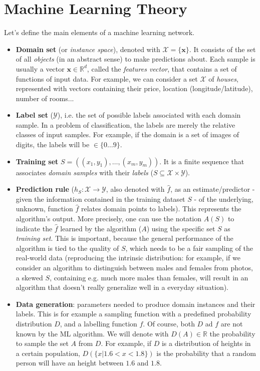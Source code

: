 \documentclass[../template.tex]{subfiles}
\begin{document}
\section{Machine Learning Theory}
Let's define the main elements of a machine learning network.
\begin{itemize}
    \item \textbf{Domain set} (or \textit{instance space}), denoted with $\mathcal{X} = \{\bm{x}\}$. It consists of the set of all \textit{objects} (in an abstract sense) to make predictions about. Each sample is usually a vector $\bm{x} \in \mathbb{R}^d$, called the \textit{features vector}, that contains a set of functions of input data. For example, we can consider a set $\mathcal{X}$ of \textit{houses}, represented with vectors containing their price, location (longitude/latitude), number of rooms...
    \item \textbf{Label set} ($\mathcal{Y}$), i.e. the set of possible labels associated with each domain sample. In a problem of classification, the labels are merely the relative classes of input samples. For example, if the domain is a set of images of digits, the labels will be $\in \{0\dots 9\}$.
    \item \textbf{Training set} $S = ((x_1, y_1), \dots, (x_m, y_m))$. It is a finite sequence that associates \textit{domain samples} with their \textit{labels} ($S \subseteq \mathcal{X} \times \mathcal{Y}$).
    \item \textbf{Prediction rule} ($h_S\colon \mathcal{X} \to \mathcal{Y}$, also denoted with $\hat{f}$, as an estimate/predictor - given the information contained in the training dataset $S$ - of the underlying, unknown, function $\hat{f}$ relates domain points to labels).  This represents the algorithm's output. More precisely, one can use the notation $A(S)$ to indicate the $\hat{f}$ learned by the algorithm ($A$) using the specific set $S$ as \textit{training set}. This is important, because the general performance of the algorithm is tied to the quality of $S$, which needs to be a fair sampling of the real-world data (reproducing the intrinsic distribution: for example, if we consider an algorithm to distinguish between males and females from photos, a skewed $S$, containing e.g. much more males than females, will result in an algorithm that doesn't really generalize well in a everyday situation).
    \item \textbf{Data generation}: parameters needed to produce domain instances and their labels. This is for example a sampling function with a predefined probability distribution $D$, and a labelling function  $f$. Of course, both $D$ ad $f$ are not known by the ML algorithm. We will denote with $D(A) \in \mathbb{R}$ the probability to sample the set $A$ from $D$. For example, if $D$ is a distribution of heights in a certain population, $D(\{x | 1.6 < x < 1.8\})$ is the probability that a random person will have an height between $1.6$ and $1.8$.\\

\end{itemize}
\end{document}
